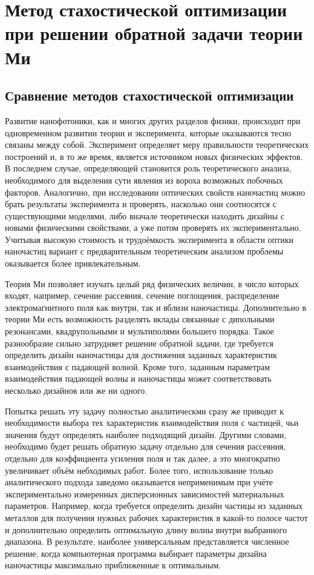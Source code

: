 \chapter{Метод стахостической оптимизации при решении обратной задачи
  теории Ми} \label{chapt2}

\section{Сравнение методов стахостической оптимизации}
\label{sec:construct-review}

Развитие нанофотоники, как и многих других разделов физики, происходит
при одновременном развитии теории и эксперимента, которые оказываются
тесно связаны между собой.  Эксперимент определяет меру правильности
теоретических построений и, в то же время, является источником новых
физических эффектов. В последнем случае, определяющей становится роль
теоретического анализа, необходимого для выделения сути явления из
вороха возможных побочных факторов.  Аналогично, при исследовании
оптических свойств наночастиц можно брать результаты эксперимента и
проверять, насколько они соотносятся с существующими моделями, либо
вначале теоретически находить дизайны с новыми физическими свойствами,
а уже потом проверять их экспериментально.  Учитывая высокую стоимость
и трудоёмкость эксперимента в области оптики наночастиц вариант с
предварительным теоретическим анализом проблемы оказывается более
привлекательным.

Теория Ми позволяет изучать целый ряд физических величин, в число
которых входят, например, сечение рассеяния, сечение
поглощения, распределение электромагнитного поля как внутри, так и
вблизи наночастицы.  Дополнительно в теории Ми есть возможность
разделять вклады связанные с дипольными резонансами, квадрупольными и
мультиполями большего порядка. Такое разнообразие сильно затрудняет
решение обратной задачи, где требуется определить дизайн наночастицы
для достижения заданных характеристик взаимодействия с падающей
волной. Кроме того, заданным параметрам взаимодействия падающей волны
и наночастицы может соответствовать несколько дизайнов или же ни
одного.

Попытка решать эту задачу полностью аналитическми сразу же приводит к
необходимости выбора тех характеристик взаимодействия поля с частицей,
чьи значения будут определять наиболее подходящий дизайн. Другими
словами, необходимо будет решать обратную задачу отдельно для сечения
рассеяния, отдельно для коэффициента усиления поля и так далее, а это
многократно увеличивает объём небходимых работ. Более того,
использование только аналитического подхода заведомо оказывается
неприменимым при учёте экспериментально измеренных дисперсионных
зависимостей материальных параметров. Например, когда требуется
определить дизайн частицы из заданных металлов для получения нужных
рабочих характеристик в какой-то полосе частот и дополнительно
определить оптимальную длину волны внутри выбранного диапазона.  В
результате, наиболее универсальным представляется численное решение,
когда компьютерная программа выбирает параметры дизайна наночастицы
максимально приближенные к оптимальным.

